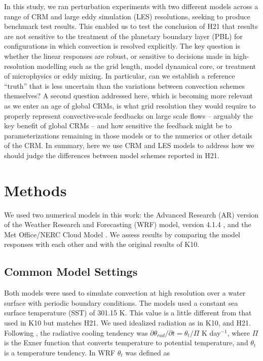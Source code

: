 \documentclass[draft]{agujournal2019}
\begin{document}
In this study, we ran perturbation experiments with two different models across
a range of CRM and large eddy simulation (LES) resolutions, seeking to produce
benchmark test results. This enabled us to test the conclusion of H21 that
results are not sensitive to the treatment of the planetary boundary layer (PBL)
for configurations in which convection is resolved explicitly. The key question
is whether the linear responses are robust, or sensitive to decisions made in
high-resolution modelling such as the grid length, model dynamical core, or
treatment of microphysics or eddy mixing. In particular, can we establish a
reference ``truth'' that is less uncertain than the variations between
convection schemes themselves? A second question addressed here, which is
becoming more relevant as we enter an age of global CRMs, is what grid
resolution they would require to properly represent convective-scale feedbacks
on large scale flows -- arguably the key benefit of global CRMs -- and how
sensitive the feedback might be to parameterizations remaining in those models
or to the numerics or other details of the CRM. In summary, here we use CRM and
LES models to address how we should judge the differences between model schemes
reported in H21.

\section{Methods}
\label{sec:methods}

We used two numerical models in this work: the Advanced Research (AR) version of
the Weather Research and Forecasting (WRF) model, version 4.1.4
\cite{Skamarock_2019}, and the Met Office/NERC Cloud Model
\cite<MONC,>{Brown_2020}.  We assess results by comparing the model responses with each other and with the original results of K10.

\subsection{Common Model Settings}

Both models were used to simulate convection at high resolution over a water
surface with periodic boundary conditions. The models used a constant sea
surface temperature (SST) of 301.15 K. This value is a little different from
that used in K10 but matches H21. We used idealized radiation as in K10,
 and H21. Following , the
radiative cooling tendency was $\partial \theta_{rad} / \partial t =
\theta_t/\Pi$ K day$^{-1}$, where $\Pi$ is the Exner function that converts
temperature to potential temperature, and $\theta_t$ is a temperature tendency.
In WRF $\theta_t$ was defined as
\end{document}
